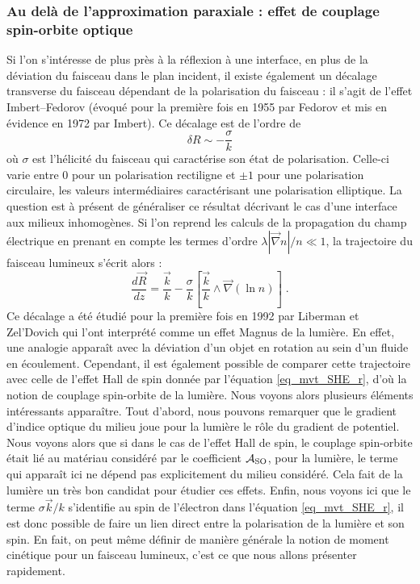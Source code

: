 \documentclass[a4paper,11pt]{article} %
\begin{document}
	\subsubsection{Au delà de l'approximation paraxiale : effet de couplage spin-orbite optique}
	
	Si l'on s'intéresse de plus près à la réflexion à une interface, en plus de la déviation du faisceau dans le plan incident, il existe également un décalage transverse du faisceau dépendant de la polarisation du faisceau : il s'agit de l'effet Imbert--Fedorov (évoqué pour la première fois en 1955 par Fedorov et mis en évidence en 1972 par Imbert). Ce décalage est de l'ordre de
	\begin{equation*}
		\delta R \sim - \frac{\sigma}{k}
	\end{equation*}
	où $ \sigma $ est l'hélicité du faisceau qui caractérise son état de polarisation. Celle-ci varie entre 0 pour un polarisation rectiligne et $\pm 1 $ pour une polarisation circulaire, les valeurs intermédiaires caractérisant une polarisation elliptique. La question est à présent de généraliser ce résultat décrivant le cas d'une interface aux milieux inhomogènes. Si l'on reprend les calculs de la propagation du champ électrique en prenant en compte les termes d'ordre $ \lambda | \vec{\nabla}n | / n \ll 1$, la trajectoire du faisceau lumineux s'écrit alors :
	\begin{equation}
		\frac{d \vec{R}}{dz} = \frac{\vec{k}}{k} - \frac{\sigma}{k} \left[ \frac{\vec{k}}{k} \wedge \vec{\nabla}(\ln n) \right] \; .
	\end{equation}
	Ce décalage a été étudié pour la première fois en 1992 par Liberman et Zel'Dovich qui l'ont interprété comme un effet Magnus de la lumière. En effet, une analogie apparaît avec la déviation d'un objet en rotation au sein d'un fluide en écoulement. Cependant, il est également possible de comparer cette trajectoire avec celle de l'effet Hall de spin donnée par l'équation \eqref{eq_mvt_SHE_r}, d'où la notion de couplage spin-orbite de la lumière. Nous voyons alors plusieurs éléments intéressants apparaître. Tout d'abord, nous pouvons remarquer que le gradient d'indice optique du milieu joue pour la lumière le rôle du gradient de potentiel. Nous voyons alors que si dans le cas de l'effet Hall de spin, le couplage spin-orbite était lié au matériau considéré par le coefficient $ \mathcal{A}_\textup{SO} $, pour la lumière, le terme qui apparaît ici ne dépend pas explicitement du milieu considéré. Cela fait de la lumière un très bon candidat pour étudier ces effets. Enfin, nous voyons ici que le terme $ \sigma \vec{k} /k $ s'identifie au spin de l'électron dans l'équation \eqref{eq_mvt_SHE_r}, il est donc possible de faire un lien direct entre la polarisation de la lumière et son spin. En fait, on peut même définir de manière générale la notion de moment cinétique pour un faisceau lumineux, c'est ce que nous allons présenter rapidement.
	
\end{document}

